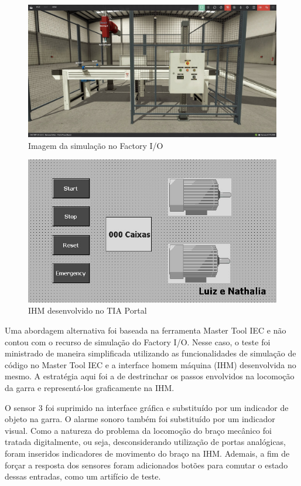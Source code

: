 \documentclass[
	12pt,				%
	openright,			%
	oneside,			%
	a4paper,			%
	english,			%
	brazil,				%
	]{abntex2}
\begin{document}
\begin{figure}[H]
\centering
\includegraphics[width=1\linewidth]{Imagens/i4.jpeg}
\caption{Imagem da simulação no Factory I/O}
\label{fig:simulaçao_3}
\end{figure}

\begin{figure}[H]
\centering
\includegraphics[width=0.5\linewidth]{Imagens/i6.jpeg}
\caption{IHM desenvolvido no TIA Portal}
\label{fig:ihm_1}
\end{figure}

Uma abordagem alternativa foi baseada na ferramenta Master Tool IEC e não contou com o recurso de simulação do Factory I/O. Nesse caso, o teste foi ministrado de maneira simplificada utilizando as funcionalidades de simulação de código no Master Tool IEC e a interface homem máquina (IHM) desenvolvida no mesmo.
A estratégia aqui foi a de destrinchar os passos envolvidos na locomoção da garra e representá-los graficamente na IHM.  

O sensor 3 foi suprimido na interface gráfica e substituído por um indicador de objeto na garra. O alarme sonoro também foi substituído por um indicador visual. Como a natureza do problema da locomoção do braço mecânico foi tratada digitalmente, ou seja, desconsiderando utilização de portas analógicas, foram inseridos indicadores de movimento do braço na IHM. Ademais, a fim de forçar a resposta dos sensores foram adicionados botões para comutar o estado dessas entradas, como um artifício de teste.
\end{document}
